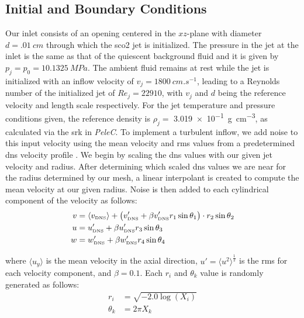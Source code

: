 \subsection{Initial and Boundary Conditions}
Our inlet consists of an opening centered in the $xz$-plane with diameter $d=\SI{.01}{cm}$ through which the \gls{sco2} jet is initialized. The pressure in the jet at the inlet is the same as that of the quiescent background fluid and it is given by $p_{j}=p_{0}=\SI{10.1325}{MPa}$. The ambient fluid remains at rest while the jet is initialized with an inflow velocity of $v_{j} = \SI{1800}{cm.s^{-1}}$, leading to a Reynolds number of the initialized jet of $Re_j = 22910$, with $v_{j}$ and $d$ being the reference velocity and length scale respectively. For the jet temperature and pressure conditions given, the reference density is $\rho_j=$ \SI{3.019e-1}{g.cm^{-3}}, as calculated via the \gls{srk} in \textit{PeleC}. To implement a turbulent inflow, we add noise to this input velocity using the mean velocity and \gls{rms} values from a predetermined \gls{dns} velocity profile \cite{DNS}. We begin by scaling the \gls{dns} values with our given jet velocity and radius. After determining which scaled \gls{dns} values we are near for the radius determined by our mesh, a linear interpolant is created to compute the mean velocity at our given radius. Noise is then added to each cylindrical component of the velocity as follows:
\begin{subequations} \label{Jet Inflow}
	\begin{align}
		v &= \langle v_{\text{\tiny{DNS}}} \rangle + \big(  v'_{\text{\tiny{DNS}}}  + \beta  v'_{\text{\tiny{DNS}}}    	r_1\sin{\theta_1}  \big) \cdot r_2 \sin{\theta_2} \label{y_flow} \\
		u &=   u'_{\text{\tiny{DNS}}}  + \beta  u'_{\text{\tiny{DNS}}}  r_3\sin{\theta_3} \label{t_flow} \\
		w &=   w'_{\text{\tiny{DNS}}}  + \beta  w'_{\text{\tiny{DNS}}}  r_4\sin{\theta_4}  \label{theta_flow}
	\end{align}
\end{subequations}  

\noindent where $\langle u_y \rangle$ is the mean velocity in the axial direction, $ u' = \langle u^2 \rangle^{\frac{1}{2}} $ is the \gls{rms} for each velocity component, and $\beta = 0.1$. Each $r_i$ and $\theta_k$ value is randomly generated as follows:
\begin{subequations} \label{Random_Variables}
	\begin{align}
		r_i &= \sqrt{-2.0 \log{(X_i)}} \label{Random_r} \\
		\theta_k &= 2 \pi X_k \label{Radom_theta}
	\end{align}
\end{subequations}

